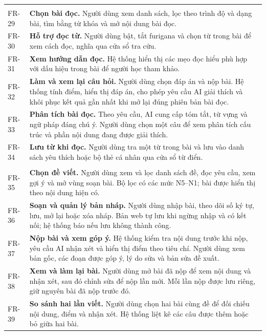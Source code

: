\begin{longtable}{@{}>{\raggedright\arraybackslash}p{3.4cm}p{12cm}@{}}
  \multicolumn{2}{@{}l}{\textbf{6. Đọc hiểu}}\\*
  FR-29 & \textbf{Chọn bài đọc.} Người dùng xem danh sách, lọc theo trình độ và dạng bài, tìm bằng từ khóa và mở nội dung bài đọc. \\
  FR-30 & \textbf{Hỗ trợ đọc từ.} Người dùng bật, tắt furigana và chọn từ trong bài để xem cách đọc, nghĩa qua cửa sổ tra cứu. \\
  FR-31 & \textbf{Xem hướng dẫn đọc.} Hệ thống hiển thị các mẹo đọc hiểu phù hợp với dấu hiệu trong bài để người học tham khảo. \\
  FR-32 & \textbf{Làm và xem lại câu hỏi.} Người dùng chọn đáp án và nộp bài. Hệ thống tính điểm, hiển thị đáp án, cho phép yêu cầu AI giải thích và khôi phục kết quả gần nhất khi mở lại đúng phiên bản bài đọc. \\
  FR-33 & \textbf{Phân tích bài đọc.} Theo yêu cầu, AI cung cấp tóm tắt, từ vựng và ngữ pháp đáng chú ý. Người dùng chọn một câu để xem phân tích cấu trúc và phần nội dung đang được giải thích. \\
  FR-34 & \textbf{Lưu từ khi đọc.} Người dùng tra một từ trong bài và lưu vào danh sách yêu thích hoặc bộ thẻ cá nhân qua cửa sổ từ điển. \\
  \midrule

  \multicolumn{2}{@{}l}{\textbf{7. Luyện viết}}\\*
  FR-35 & \textbf{Chọn đề viết.} Người dùng xem và lọc danh sách đề, đọc yêu cầu, xem gợi ý và mở vùng soạn bài. Bộ lọc có các mức N5--N1; bài được hiển thị theo nội dung hiện có. \\
  FR-36 & \textbf{Soạn và quản lý bản nháp.} Người dùng nhập bài, theo dõi số ký tự, lưu, mở lại hoặc xóa nháp. Bản web tự lưu khi ngừng nhập và có kết nối; hệ thống báo nếu lưu không thành công. \\
  FR-37 & \textbf{Nộp bài và xem góp ý.} Hệ thống kiểm tra nội dung trước khi nộp, yêu cầu AI nhận xét và hiển thị điểm theo tiêu chí. Người dùng xem bản gốc, các đoạn được góp ý, lý do sửa và bản sửa đề xuất. \\
  FR-38 & \textbf{Xem và làm lại bài.} Người dùng mở bài đã nộp để xem nội dung và nhận xét, sau đó chỉnh sửa để nộp lần mới. Mỗi lần nộp được lưu riêng, giữ nguyên bài đã nộp trước đó. \\
  FR-39 & \textbf{So sánh hai lần viết.} Người dùng chọn hai bài cùng đề để đối chiếu nội dung, điểm và nhận xét. Hệ thống liệt kê các câu được thêm hoặc bỏ giữa hai bài. \\
  \midrule


\end{longtable}
